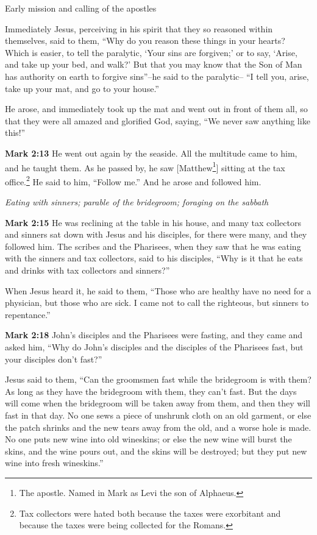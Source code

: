 \documentclass[10pt,twoside]{article} %
\newcommand{\quotesize}{\normalsize{}}
\newenvironment{quotetext}{\begingroup\quotesize}{\endgroup}
\newcommand{\bible}[2]{\begin{quotetext}\textbf{#1} #2\end{quotetext}}
\newcommand{\gospelmark}[2]{\bible{Mark #1}{#2}}
\newcommand{\subhead}[1]{\emph{#1}\par}
\begin{document}
\begin{section}{Early mission and calling of the apostles}
{  Immediately Jesus, perceiving in his spirit that they so reasoned within themselves, said to them, ``Why do you reason these things in your hearts?    Which is easier, to tell the paralytic, `Your sins are forgiven;' or to say, `Arise, and take up your bed, and walk?'    But that you may know that the Son of Man has authority on earth to forgive sins''--he said to the paralytic--    ``I tell you, arise, take up your mat, and go to your house.'' 

He arose, and immediately took up the mat and went out in front of them all, so that they were all amazed and glorified God, saying, ``We never saw anything like this!''}

\gospelmark{2:13}{He went out again by the seaside. All the multitude came to him, and he taught them.   As he passed by, he saw 
[Matthew\footnote{The apostle. Named in Mark as Levi the son of Alphaeus.}] sitting at the tax office.\footnote{Tax collectors were hated
both because the taxes were exorbitant and because the taxes were being collected for the Romans.}
He said to him, ``Follow me.'' And he arose and followed him.}

\subhead{Eating with sinners; parable of the bridegroom; foraging on the sabbath}

\gospelmark{2:15}{  He was reclining at the table in his house, and many tax collectors and sinners sat down with Jesus and his disciples, for there were many, and they followed him.   The scribes and the Pharisees, when they saw that he was eating with the sinners and tax collectors, said to his disciples, ``Why is it that he eats and drinks with tax collectors and sinners?''

  When Jesus heard it, he said to them, ``Those who are healthy have no need for a physician, but those who are sick. I came not to call the righteous, but sinners to repentance.''}

\gospelmark{2:18}{John's disciples and the Pharisees were fasting, and they came and asked him, ``Why do John's disciples and the disciples of the Pharisees fast, but your disciples don't fast?''

  Jesus said to them, ``Can the groomsmen fast while the bridegroom is with them? As long as they have the bridegroom with them, they can't fast.    But the days will come when the bridegroom will be taken away from them, and then they will fast in that day.    No one sews a piece of unshrunk cloth on an old garment, or else the patch shrinks and the new tears away from the old, and a worse hole is made.    No one puts new wine into old wineskins; or else the new wine will burst the skins, and the wine pours out, and the skins will be destroyed; but they put new wine into fresh wineskins.'' }


\end{section}
\end{document}
